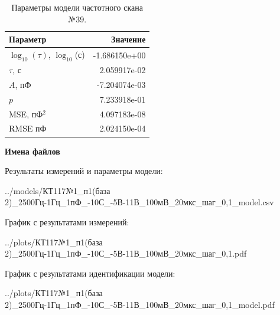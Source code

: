 \begin{table}[!ht]
    \centering
    \caption{Параметры модели частотного скана №39.}
    \begin{tabular}{|l|r|}
        \hline
        Параметр                                       & Значение                  \\ \hline
        $\log_{10}(\tau)$, $\log_{10}$(с)              & -1.686150e+00             \\ \hline
        $\tau$, с                                      & 2.059917e-02              \\ \hline
        $A$, пФ                                        & -7.204074e-03             \\ \hline
        $p$                                            & 7.233918e-01              \\ \hline
        MSE, пФ$^2$                                    & 4.097183e-08              \\ \hline
        RMSE пФ                                        & 2.024150e-04              \\ \hline
    \end{tabular}
    \label{table:frequency_scan_model_39}
\end{table}

\textbf{Имена файлов}

Результаты измерений и параметры модели:

\scriptsize../models/КТ117№1\_п1(база 2)\_2500Гц-1Гц\_1пФ\_-10С\_-5В-11В\_100мВ\_20мкс\_шаг\_0,1\_model.csv
\normalsize

График с результатами измерений:

\scriptsize../plots/КТ117№1\_п1(база 2)\_2500Гц-1Гц\_1пФ\_-10С\_-5В-11В\_100мВ\_20мкс\_шаг\_0,1.pdf
\normalsize

График с результатами идентификации модели:

\scriptsize../plots/КТ117№1\_п1(база 2)\_2500Гц-1Гц\_1пФ\_-10С\_-5В-11В\_100мВ\_20мкс\_шаг\_0,1\_model.pdf
\normalsize

